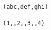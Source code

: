 \documentclass{article}
\begin{document}
\newcommand*\myprocessor[1]{\texttt{(#1)}}
\ekvcsvloop\myprocessor{abc,def,ghi}\par
\ekvcsvloop\myprocessor{1,,2,,3,,4}\par
\end{document}

